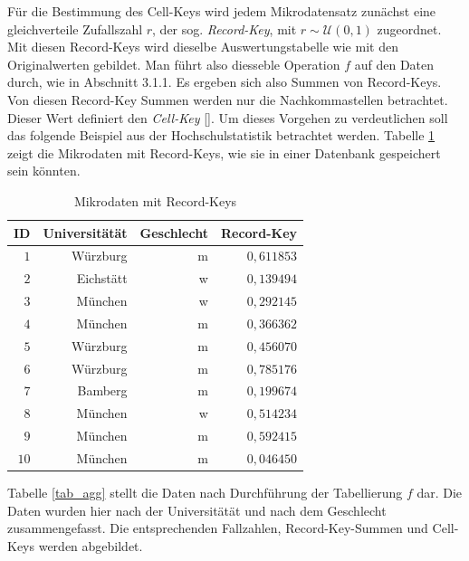 Für die Bestimmung des Cell-Keys wird jedem Mikrodatensatz zunächst eine gleichverteile Zufallszahl $r$, der sog. \textit{Record-Key}, mit $r \sim \mathcal{U}(0, 1)$ zugeordnet. Mit diesen Record-Keys wird dieselbe Auswertungstabelle wie mit den Originalwerten gebildet. Man führt also diesseble  Operation $f$ auf den Daten durch, wie in Abschnitt 3.1.1. Es ergeben sich also Summen von Record-Keys. Von diesen Record-Key Summen werden nur die Nachkommastellen betrachtet. Dieser Wert definiert den \textit{Cell-Key} [\cite{Enderle}]. Um dieses Vorgehen zu verdeutlichen soll das folgende Beispiel aus der Hochschulstatistik betrachtet werden. Tabelle \ref{tab_mikrodaten} zeigt die Mikrodaten mit Record-Keys, wie sie in einer Datenbank gespeichert sein könnten.

\begin{table}[h]
    \centering
    \begin{tabular}{ r r r r }
        \textbf{ID} \vline & \textbf{Universitätät} & \textbf{Geschlecht} & \textbf{Record-Key} \\ 
        \hline
        $1$ \vline & Würzburg & m & $0,611853$ \\
        $2$ \vline & Eichstätt & w & $0,139494$ \\
        $3$ \vline & München & w & $0,292145$ \\
        $4$ \vline & München & m & $0,366362$ \\
        $5$ \vline & Würzburg & m & $0,456070$ \\
        $6$ \vline & Würzburg & m & $0,785176$ \\
        $7$ \vline & Bamberg & m & $0,199674$ \\
        $8$ \vline & München & w & $0,514234$ \\
        $9$ \vline & München & m & $0,592415$ \\
        $10$ \vline & München & m & $0,046450$
    \end{tabular}
    \caption{Mikrodaten mit Record-Keys}
    \label{tab_mikrodaten}
\end{table}

Tabelle \ref{tab_agg} stellt die Daten nach Durchführung der Tabellierung $f$ dar. Die Daten wurden hier nach der Universitätät und nach dem Geschlecht zusammengefasst. Die entsprechenden Fallzahlen, Record-Key-Summen und Cell-Keys werden abgebildet. 

